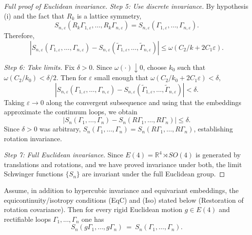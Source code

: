 \documentclass[11pt]{amsart}
\begin{document}
\begin{proof}[Full proof of Euclidean invariance]
\emph{Step 5: Use discrete invariance.} By hypothesis (i) and the fact that $R_k$ is a lattice symmetry,
\[
  S_{n,\varepsilon}(R_k\Gamma_{1,\varepsilon}, \ldots, R_k\Gamma_{n,\varepsilon}) = S_{n,\varepsilon}(\Gamma_{1,\varepsilon}, \ldots, \Gamma_{n,\varepsilon}).
\]
Therefore,
\[
  |S_{n,\varepsilon}(\Gamma_{1,\varepsilon}, \ldots, \Gamma_{n,\varepsilon}) - S_{n,\varepsilon}(\tilde{\Gamma}_{1,\varepsilon}, \ldots, \tilde{\Gamma}_{n,\varepsilon})| \le \omega(C_2/k + 2C_1\varepsilon).
\]

\emph{Step 6: Take limits.} Fix $\delta > 0$. Since $\omega(\cdot) \downarrow 0$, choose $k_0$ such that $\omega(C_2/k_0) < \delta/2$. Then for $\varepsilon$ small enough that $\omega(C_2/k_0 + 2C_1\varepsilon) < \delta$,
\[
  |S_{n,\varepsilon}(\Gamma_{1,\varepsilon}, \ldots, \Gamma_{n,\varepsilon}) - S_{n,\varepsilon}(\tilde{\Gamma}_{1,\varepsilon}, \ldots, \tilde{\Gamma}_{n,\varepsilon})| < \delta.
\]
Taking $\varepsilon \to 0$ along the convergent subsequence and using that the embeddings approximate the continuum loops, we obtain
\[
  |S_n(\Gamma_1, \ldots, \Gamma_n) - S_n(R\Gamma_1, \ldots, R\Gamma_n)| \le \delta.
\]
Since $\delta > 0$ was arbitrary, $S_n(\Gamma_1, \ldots, \Gamma_n) = S_n(R\Gamma_1, \ldots, R\Gamma_n)$, establishing rotation invariance.

\emph{Step 7: Full Euclidean invariance.} Since $E(4) = \mathbb{R}^4 \rtimes SO(4)$ is generated by translations and rotations, and we have proved invariance under both, the limit Schwinger functions $\{S_n\}$ are invariant under the full Euclidean group.
\end{proof}

\begin{corollary}
Assume, in addition to hypercubic invariance and equivariant embeddings, the equicontinuity/isotropy conditions (EqC) and (Iso) stated below (Restoration of rotation covariance). Then for every rigid Euclidean motion $g\in E(4)$ and rectifiable loops $\Gamma_1,\dots,\Gamma_n$ one has
\[
  S_n(g\Gamma_1,\dots,g\Gamma_n)\ =\ S_n(\Gamma_1,\dots,\Gamma_n).
\]
\end{corollary}
\end{document}
